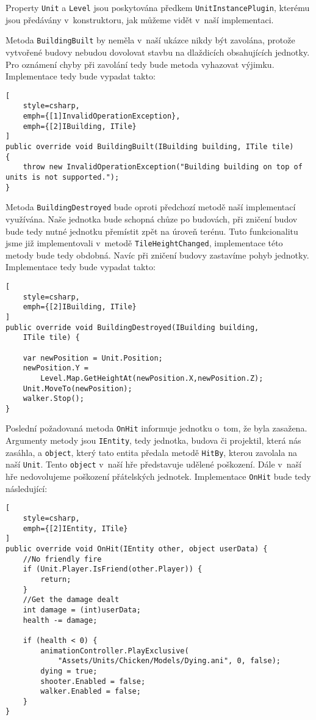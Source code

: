 Property \texttt{Unit} a \texttt{Level} jsou poskytována předkem \texttt{UnitInstancePlugin}, kterému jsou předávány v~konstruktoru, jak můžeme vidět v~naší implementaci.


Metoda \texttt{BuildingBuilt} by neměla v~naší ukázce nikdy být zavolána, protože vytvořené budovy nebudou dovolovat stavbu na dlaždicích obsahujících jednotky. Pro oznámení chyby při zavolání tedy bude metoda vyhazovat výjimku. Implementace tedy bude vypadat takto:

\begin{lstlisting}[
	style=csharp,
	emph={[1]InvalidOperationException},
	emph={[2]IBuilding, ITile}
]
public override void BuildingBuilt(IBuilding building, ITile tile)
{
	throw new InvalidOperationException("Building building on top of units is not supported.");
}
\end{lstlisting}

Metoda \texttt{BuildingDestroyed} bude oproti předchozí metodě naší implementací využívána. Naše jednotka bude schopná chůze po budovách, při zničení budov bude tedy nutné jednotku přemístit zpět na úroveň terénu. Tuto funkcionalitu jsme již implementovali v~metodě \texttt{TileHeightChanged}, implementace této metody bude tedy obdobná. Navíc při zničení budovy zastavíme pohyb jednotky. Implementace tedy bude vypadat takto:

\begin{lstlisting}[
	style=csharp,
	emph={[2]IBuilding, ITile}
]
public override void BuildingDestroyed(IBuilding building, 
	ITile tile) {
	
	var newPosition = Unit.Position;
	newPosition.Y = 
		Level.Map.GetHeightAt(newPosition.X,newPosition.Z);
	Unit.MoveTo(newPosition);
	walker.Stop();
}
\end{lstlisting}

Poslední požadovaná metoda \texttt{OnHit} informuje jednotku o~tom, že byla zasažena. Argumenty metody jsou \texttt{IEntity}, tedy jednotka, budova či projektil, která nás zasáhla, a \texttt{object}, který tato entita předala metodě \texttt{HitBy}, kterou zavolala na naší \texttt{Unit}. Tento \texttt{object} v~naší hře představuje udělené poškození. Dále v~naší hře nedovolujeme poškození přátelských jednotek. Implementace \texttt{OnHit} bude tedy následující:

\begin{lstlisting}[
	style=csharp,
	emph={[2]IEntity, ITile}
]
public override void OnHit(IEntity other, object userData) {
	//No friendly fire
	if (Unit.Player.IsFriend(other.Player)) {
		return;
	}
	//Get the damage dealt
	int damage = (int)userData;
	health -= damage;

	if (health < 0) {
		animationController.PlayExclusive(
			"Assets/Units/Chicken/Models/Dying.ani", 0, false);
		dying = true;
		shooter.Enabled = false;
		walker.Enabled = false;
	}
}
\end{lstlisting}

